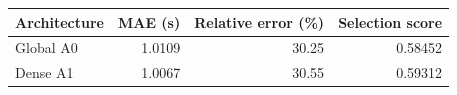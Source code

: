 \begin{tabular}{lrrr}
\toprule
Architecture & MAE (s) & Relative error (\%) & Selection score \\
\midrule
Global A0 & 1.0109 & 30.25 & 0.58452 \\
Dense A1 & 1.0067 & 30.55 & 0.59312 \\
\bottomrule
\end{tabular}
